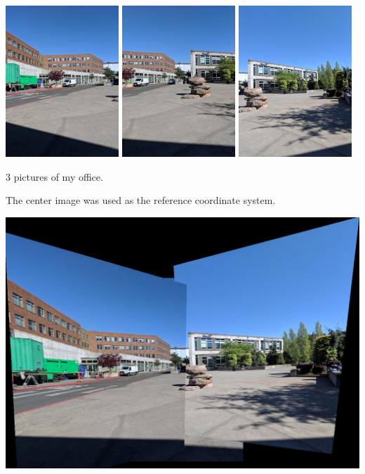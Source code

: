 \documentclass[letterpaper]{article}
\begin{document}
\begin{center}
  \includegraphics[width=0.32\textwidth]{google3.jpg}
  \includegraphics[width=0.32\textwidth]{google1.jpg}
  \includegraphics[width=0.32\textwidth]{google2.jpg}
  
  3 pictures of my office.
\end{center}

The center image was used as the reference coordinate system.

\begin{center}
  \includegraphics[width=\textwidth]{google_stitched.png} 
\end{center}
\end{document}
